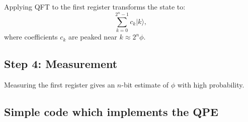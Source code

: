 \documentclass[%
oneside,                 %
final,                   %
10pt]{article}
\begin{document}
\begin{block}{}
Applying QFT to the first register transforms the state to:
\[
    \sum_{k=0}^{2^n -1} c_k \vert k \rangle ,
\]
where coefficients $c_k$ are peaked near $k \approx 2^n \phi$.

\end{block}
\subsection{Step 4: Measurement}
\begin{block}{}
Measuring the first register gives an $n$-bit estimate of $\phi$ with high probability.
\end{block}

\subsection{Simple code which implements the QPE}
\end{document}
